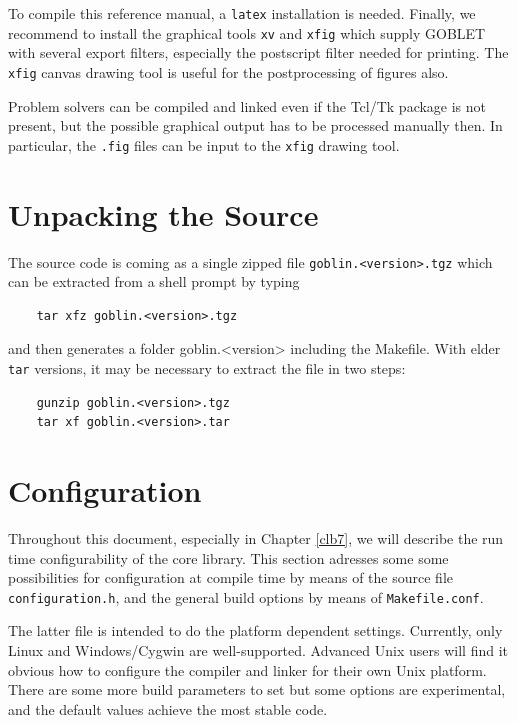 \documentclass[a4paper,11pt,twoside]{book}
\begin{document}
\begin{multicols}{2}
To compile this reference manual, a \verb/latex/ installation is needed.
Finally, we recommend to install the graphical tools \verb/xv/ and \verb/xfig/
which supply GOBLET with several export filters, especially the postscript
filter needed for printing. The \verb/xfig/ canvas drawing tool is useful for
the postprocessing of figures also.

Problem solvers can be compiled and linked even if the Tcl/Tk package is not
present, but the possible graphical output has to be processed manually then.
In particular, the \verb/.fig/ files can be input to the \verb/xfig/ drawing
tool.



\section{Unpacking the Source}

The source code is coming as a single zipped file \verb/goblin.<version>.tgz/
which can be extracted from a shell prompt by typing
\begin{verbatim}
    tar xfz goblin.<version>.tgz
\end{verbatim}
and then generates a folder goblin.<version> including the Makefile. With elder
\verb/tar/ versions, it may be necessary to extract the file in two steps:
\begin{verbatim}
    gunzip goblin.<version>.tgz
    tar xf goblin.<version>.tar
\end{verbatim}




\section{Configuration}

Throughout this document, especially in Chapter \ref{clb7}, we will describe
the run time configurability of the core library. This section adresses some
some possibilities for configuration at compile time by means of the source
file \verb/configuration.h/, and the general build options by means of
\verb/Makefile.conf/.

The latter file is intended to do the platform dependent settings. Currently,
only Linux and Windows/Cygwin are well-supported. Advanced Unix users will find
it obvious how to configure the compiler and linker for their own Unix platform.
There are some more build parameters to set but some options are experimental,
and the default values achieve the most stable code.


\end{multicols}
\end{document}
